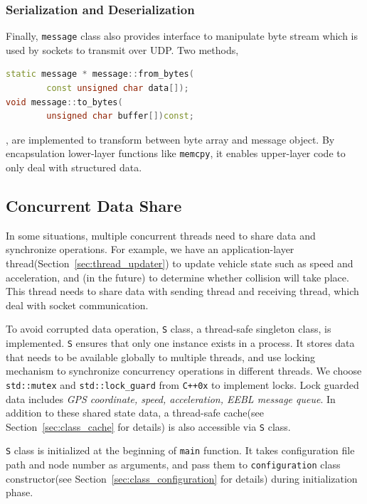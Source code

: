 \documentclass[twocolumn]{article}
\begin{document}
\subsubsection{Serialization and Deserialization}
Finally, {\tt message} class also provides interface to manipulate byte stream which is used by sockets to transmit over UDP. Two methods, 
\begin{lstlisting}[language=C++,keywordstyle=\color{blue}]
static message * message::from_bytes(
        const unsigned char data[]);
void message::to_bytes(
        unsigned char buffer[])const;
\end{lstlisting}
, are implemented to transform between byte array and message object. By encapsulation lower-layer functions like {\tt memcpy}, it enables upper-layer code to only deal with structured data.
\subsection{Concurrent Data Share}

\par{In some situations, multiple concurrent threads need to share data and synchronize operations. For example, we have an application-layer thread(Section~\ref{sec:thread_updater}) to update vehicle state such as speed and acceleration, and (in the future) to determine whether collision will take place. This thread needs to share data with sending thread and receiving thread, which deal with socket communication.}
\par{To avoid corrupted data operation, {\tt S} class, a thread-safe singleton class, is implemented. {\tt S} ensures that only one instance exists in a process. It stores data that needs to be available globally to multiple threads, and use locking mechanism to synchronize concurrency operations in different threads. We choose {\tt std::mutex} and {\tt std::lock\_guard} from {\tt C++0x} to implement locks. Lock guarded data includes {\it GPS coordinate, speed, acceleration, EEBL message queue}. In addition to these shared state data, a thread-safe cache(see Section~\ref{sec:class_cache} for details) is also accessible via {\tt S} class.}
\par{{\tt S} class is initialized at the beginning of {\tt main} function. It takes configuration file path and node number as arguments, and pass them to {\tt configuration} class constructor(see Section~\ref{sec:class_configuration} for details) during initialization phase.}
\end{document}
